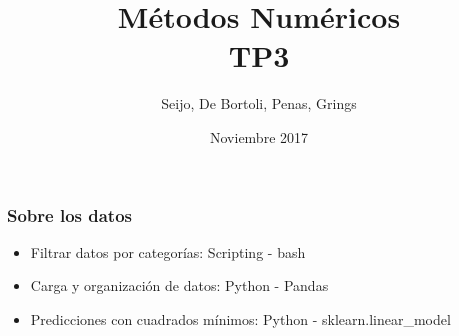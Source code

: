 \documentclass{beamer}
\title[TP3]{Métodos Numéricos \\ TP3} %
\author{Seijo, De Bortoli, Penas, Grings} %
\institute[DC] %
{
}
\date{Noviembre 2017} %
\begin{document}
\begin{frame}
\titlepage %
\end{frame}






\begin{frame}






\frametitle{Sobre los datos}
\begin{itemize}
    \item{Filtrar datos por categorías: Scripting - bash}
    \item{Carga y organización de datos: Python - Pandas}
    \item{Predicciones con cuadrados mínimos: Python - sklearn.linear\_model}
\end{itemize}

\end{frame}
\end{document}
